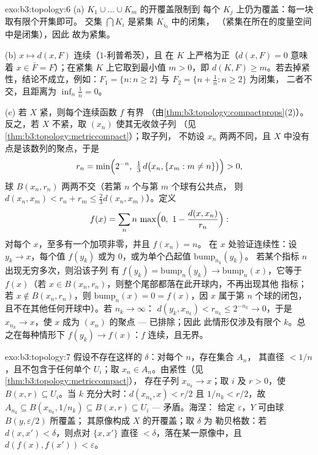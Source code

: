 \begin{solution}{exo:b3:topology:6}
(a) $K_1 \cup \dots \cup K_m$ 的开覆盖限制到
每个 $K_j$ 上仍为覆盖：每一块取有限个开集即可。
交集 $\bigcap K_i$ 是紧集 $K_{i_0}$ 中的闭集，
（紧集在所在的度量空间中是闭集），因此
故为紧集。

(b) $x \mapsto d(x, F)$ 连续（$1$-利普希茨），且
在 $K$ 上严格为正（$d(x, F) = 0$ 意味着 $x \in \bar F =
F$）；在紧集 $K$ 上它取到最小值 $m > 0$，即 $d(K, F)
\geq m$。若去掉紧性，结论不成立，例如：$F_1 = \{n : n \geq
2\}$ 与 $F_2 = \{n + \frac1n : n \geq 2\}$ 为闭集，
二者不交，且距离为 $\inf_n \frac1n = 0$。

(c) 若 $X$ 紧，则每个连续函数 $f$ 有界
（由\cref{thm:b3:topology:compactprops}(2)）。反之，若 $X$
不紧，取 $(x_n)$ 使其无收敛子列
（见\cref{thm:b3:topology:metriccompact}）；取子列，
不妨设 $x_n$ 两两不同，且
$X$ 中没有点是该数列的聚点，于是
\[
r_n = \min\Bigl(2^{-n},\ \tfrac13\,d\bigl(x_n, \{x_m : m \neq
n\}\bigr)\Bigr) > 0,
\]
球 $B(x_n, r_n)$ 两两不交（若第 $n$ 个与第 $m$ 个球有公共点，
则 $d(x_n, x_m) < r_n +
r_m \leq \frac23 d(x_n, x_m)$）。定义
\[
f(x) = \sum_{n} n\,\max\Bigl(0,\ 1 - \frac{d(x,
x_n)}{r_n}\Bigr):
\]
对每个 $x$，至多有一个加项非零，并且 $f(x_n) = n$。
在 $x$ 处验证连续性：设 $y_k \to x$，每个值 $f(y_k)$
或为 $0$，或为单个凸起值 $\mathrm{bump}_{n_k}(y_k)$。
若某个指标 $n$ 出现无穷多次，则沿该子列
有 $f(y_k) = \mathrm{bump}_n(y_k) \to
\mathrm{bump}_n(x)$，它等于 $f(x)$（若 $x \in B(x_n,
r_n)$，则整个尾部都落在此开球内，不再出现其他
指标；若 $x \notin B(x_n, r_n)$，则
$\mathrm{bump}_n(x) = 0 = f(x)$，因 $x$
属于第 $n$ 个球的闭包，且不在其他任何开球中）。若 $n_k \to \infty$：
$d(y_k, x_{n_k}) < r_{n_k} \leq 2^{-n_k} \to 0$，于是 $x_{n_k}
\to x$，使 $x$ 成为 $(x_n)$ 的聚点 --- 已排除；因此
此情形仅涉及有限个 $k$。总之在每种情形下
$f(y_k) \to f(x)$：$f$ 连续，且无界。
\end{solution}

\begin{solution}{exo:b3:topology:7}
假设不存在这样的 $\delta$：对每个 $n$，存在集合 $A_n$，
其直径 $< 1/n$，且不包含于任何单个 $U_i$；取 $x_n \in
A_n$。由紧性（见\cref{thm:b3:topology:metriccompact}），
存在子列 $x_{n_k} \to x$；取 $i$ 及 $r > 0$，使 $B(x,
r) \subseteq U_i$。当 $k$ 充分大时：$d(x_{n_k}, x) < r/2$ 且
$1/n_k < r/2$，故 $A_{n_k} \subseteq B(x_{n_k}, 1/n_k)
\subseteq B(x, r) \subseteq U_i$ --- 矛盾。海涅：
给定 $\varepsilon$，$Y$ 可由球 $B(y, \varepsilon/2)$ 所覆盖；
其原像构成 $X$ 的开覆盖；取 $\delta$ 为
勒贝格数：若 $d(x, x') < \delta$，则点对 $\{x, x'\}$
直径 $< \delta$，落在某一原像中，且 $d(f(x),
f(x')) < \varepsilon$。
\end{solution}

